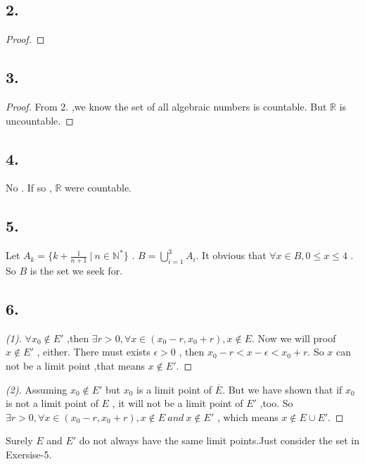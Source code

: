 \documentclass{report}
\begin{document}
            \subsection*{2.}
                \begin{proof}
                    
                \end{proof}
            \subsection*{3.}
                \begin{proof}
                    From 2. ,we know the set of all algebraic numbers is countable.
                    But $\mathbb{R}$ is uncountable.
                \end{proof}
            \subsection*{4.}
                No . If so , $\mathbb{R}$ were countable.
            \subsection*{5.}
                Let $A_k=\{k+\frac{1}{n+1} \ | \ n \in \mathbb{N^*}\}$ .
                $B= \bigcup_{i =1 }^3 A_i$.
                It obvious that $\forall x  \in B, 0 \le  x \le 4$ .
                So $B$ is the set we seek for.
            \subsection*{6.}
                \begin{proof}[(1)]
                    $\forall x_0 \notin E'$ ,then $ \exists r > 0, \forall x \in (x_0-r,x_0+r), x \notin E$.
                    Now we will proof $x \notin E'$ , either.
                    There must exists $ \epsilon > 0 $ , then $x_0 -r < x- \epsilon < x_0 + r $.
                    So $x$ can not be a limit point ,that means $x \notin E'$. 
                \end{proof}
                \begin{proof}[(2)]
                    Assuming $x_0 \notin E'$ but $x_0$ is a limit point of $\overline{E}$.
                    But we have shown that if $x_0$ is not a limit point of $E$ , it will not be a limit point of $E'$ ,too.
                    So $ \exists r > 0, \forall x \in (x_0-r,x_0+r), x \notin E \ and \ x \notin E'$ , 
                    which means $x \notin E \cup E'$.
                \end{proof}
                Surely $E$ and $E'$ do not always have the same limit points.Just consider the set in Exersise-5.
\end{document}
